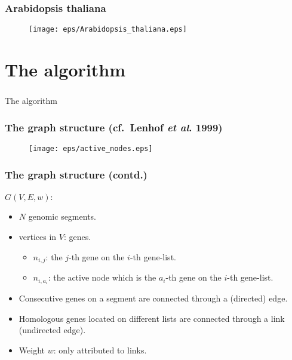 \documentclass[xcolor=dvipsnames,envcountsect,handout]{beamer}
\begin{document}
\begin{frame}
\frametitle{Arabidopsis thaliana}
\begin{figure}[H]
\texttt{[image: eps/Arabidopsis\_thaliana.eps]}
\end{figure}
\end{frame}


\section{The algorithm}



\begin{frame}
\frametitle{}
\begin{center}
{\LARGE The algorithm}
\end{center}
\end{frame}


\begin{frame}
\frametitle{The graph structure (cf.~Lenhof {\it et al}. 1999)}
\begin{figure}[H]
\centering
\texttt{[image: eps/active\_nodes.eps]}
\end{figure}
\end{frame}


\begin{frame}
\frametitle{The graph structure (contd.)}
$G(V,E,w)$: 
\begin{itemize}
\item $N$ genomic segments. 
\vspace{5pt}
\item vertices in $V$: genes. 
\begin{itemize}
\item $n_{i,j}$: the $j$-th gene on the $i$-th gene-list.
\item $n_{i,a_i}$: the active node which is the $a_i$-th gene on the
$i$-th gene-list. 
\end{itemize}
\vspace{5pt}
\item Consecutive genes on a segment are connected through a
\alert{(directed) edge}. 
\vspace{5pt}
\item Homologous genes located on different lists are connected
through a \alert{link} (undirected edge).
\vspace{5pt}
\item Weight $w$: only attributed to links. 
\end{itemize}
\end{frame}
\end{document}
